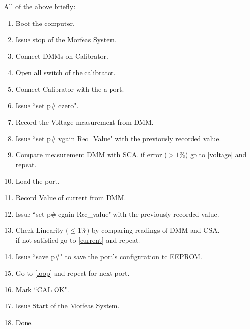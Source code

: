 All of the above briefly:
\begin{enumerate}
	\item Boot the computer.
	\item Issue stop of the Morfeas System.
	\item Connect DMMs on Calibrator.
	\item Open all switch of the calibrator.
	\item Connect Calibrator with the a port.\label{loop}
	\item Issue ``set p\# czero".
	\item Record the Voltage measurement from DMM.\label{voltage}
	\item Issue ``set p\# vgain Rec\_Value" with the previously recorded value.
	\item Compare measurement DMM with SCA. if error ($>1\%$) go to \ref{voltage} and repeat.
	\item Load the port.\label{current}
	\item Record Value of current from DMM.
	\item Issue ``set p\# cgain Rec\_value" with the previously recorded value.
	\item Check Linearity ($\leq1\%$) by comparing readings of DMM and CSA.\\ if not satisfied go to \ref{current} and repeat.
	\item Issue ``save p\#" to save the port's configuration to EEPROM.
	\item Go to \ref{loop} and repeat for next port.
	\item Mark ``CAL OK".
	\item Issue Start of the Morfeas System.
	\item Done.
\end{enumerate}
